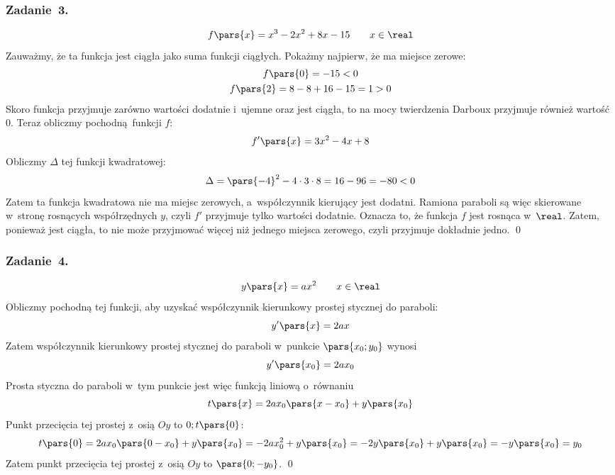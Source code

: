 \subsubsection*{Zadanie~3.}
\begin{equation*}
    f\pars{x} = x^3 - 2x^2 + 8x - 15 \qquad x \in \real
\end{equation*}
Zauważmy, że ta funkcja jest ciągła jako suma funkcji ciągłych. Pokażmy najpierw, że ma miejsce zerowe:
\begin{gather*}
    f\pars{0} = -15 < 0\\
    f\pars{2} = 8 - 8 + 16 - 15 = 1 > 0
\end{gather*}
Skoro funkcja przyjmuje zarówno wartości dodatnie i~ujemne oraz jest ciągła, to na mocy twierdzenia Darboux przyjmuje również wartość \(0\). Teraz obliczmy pochodną funkcji \(f\):
\begin{equation*}
    f'\pars{x} = 3x^2 - 4x + 8
\end{equation*}
Obliczmy \(\Delta\) tej funkcji kwadratowej:
\begin{equation*}
    \Delta = \pars{-4}^2 - 4 \cdot 3 \cdot 8 = 16 - 96 = -80 < 0
\end{equation*}
Zatem ta funkcja kwadratowa nie ma miejsc zerowych, a~współczynnik kierujący jest dodatni. Ramiona paraboli są więc skierowane w~stronę rosnących współrzędnych \(y\), czyli \(f'\) przyjmuje tylko wartości dodatnie. Oznacza to, że funkcja \(f\) jest rosnąca w~\(\real\). Zatem, ponieważ jest ciągła, to nie może przyjmować więcej niż jednego miejsca zerowego, czyli przyjmuje dokładnie jedno.
\qed
\subsubsection*{Zadanie~4.}
\begin{equation*}
    y\pars{x} = ax^2 \qquad x \in \real
\end{equation*}
Obliczmy pochodną tej funkcji, aby uzyskać współczynnik kierunkowy prostej stycznej do paraboli:
\begin{equation*}
    y'\pars{x} = 2ax
\end{equation*}
Zatem współczynnik kierunkowy prostej stycznej do paraboli w~punkcie \(\pars{x_0; y_0}\) wynosi
\begin{equation*}
    y'\pars{x_0} = 2ax_0
\end{equation*}
Prosta styczna do paraboli w~tym punkcie jest więc funkcją liniową o~równaniu
\begin{equation*}
    t\pars{x} = 2ax_0\pars{x - x_0} + y\pars{x_0}
\end{equation*}
Punkt przecięcia tej prostej z~osią \(Oy\) to \(0; t\pars{0}\):
\begin{equation*}
    t\pars{0}
        = 2ax_0\pars{0 - x_0} + y\pars{x_0}
        = -2ax_0^2 + y\pars{x_0}
        = -2y\pars{x_0} + y\pars{x_0}
        = -y\pars{x_0}
        = y_0
\end{equation*}
Zatem punkt przecięcia tej prostej z~osią \(Oy\) to \(\pars{0; -y_0}\).
\qed
